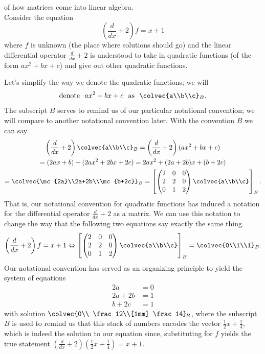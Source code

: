 \begin{example}{of how matrices come into linear algebra.}\\
Consider the equation
\[\left( \frac{d}{dx}+2\right) f= x+1\]
where $f$ is unknown (the place where solutions should go) and  the linear differential operator $\frac{d}{dx}+2$ is understood to take in quadratic functions (of the form $ax^2+bx+c$) and give out other quadratic functions. 

Let's simplify the way we denote the quadratic functions; 
we will  
\[{\rm denote~~}ax^2+bx+c \text{~~as~~} \colvec{a\\b\\c}_B.\]
The subscript $B$ serves to remind us of our particular notational convention; we will compare to another notational convention later. With the convention $B$ we can say
\begin{gather*}  \left( \frac{d}{dx}+2\right) \colvec{a\\b\\c}_B
=\left( \frac{d}{dx}+2\right)(ax^2+bx+c)\\
=(2ax+b)+(2ax^2+2bx+2c) = 2a x^2+(2a+2b)x+(b+2c)
\\
=\colvec{\mc{2a}\\2a+2b\\\mc{b+2c}}_B
= 
\left[ 
\begin{pmatrix}   
2&0&0\\
2&2&0\\
0&1&2
\end{pmatrix}
\colvec{a\\b\\c}\right]_B.
\end{gather*}
That is, our notational convention for quadratic functions has induced a notation for the differential operator $\frac{d}{dx}+2$ as a matrix. 
We can use this notation to change the way that 
the following two equations say exactly the same thing.
\[
 \left( \frac{d}{dx}+2\right) f=x+1
 \Leftrightarrow
\left[ 
\begin{pmatrix}   
2&0&0\\
2&2&0\\
0&1&2
\end{pmatrix}
\colvec{a\\b\\c}\right]_B = \colvec{0\\1\\1}_B.\]
Our notational convention has served as an organizing principle to yield the system of equations 
\[
\begin{array}{cc}
2a&=0\\
2a+2b&=1\\
b+2c&=1
\end{array}
\]
with solution $\colvec{0\\ \frac12\\[1mm] \frac14}_{\!B}  $, where the subscript $B$ is used to remind us that this stack of numbers  encodes the vector $\frac12x+\frac14$, which is indeed the  solution to our equation since, substituting for $f$ yields the true statement $\left(\frac{d}{dx}+2\right)(\frac12x+\frac14)=x+1$. 
\end{example}

